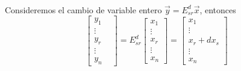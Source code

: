 \paragraph{}
Consideremos el cambio de variable entero $\overrightarrow{y} = E_{sr}^{d}\overrightarrow{x}$, entonces
\begin{equation*}
    \begin{bmatrix}
    y_{1}\\
    \vdots\\
    y_{r}\\
    \vdots\\
    y_{n}&
    \end{bmatrix} = E_{sr}^{d}\begin{bmatrix}
    x_{1}\\
    \vdots\\
    x_{r}\\
    \vdots\\
    x_{n}
    \end{bmatrix} = \begin{bmatrix}
     x_{1}\\
    \vdots\\
    x_{r} + dx_{s}\\
    \vdots\\
    x_{n}
    \end{bmatrix}
\end{equation*}

